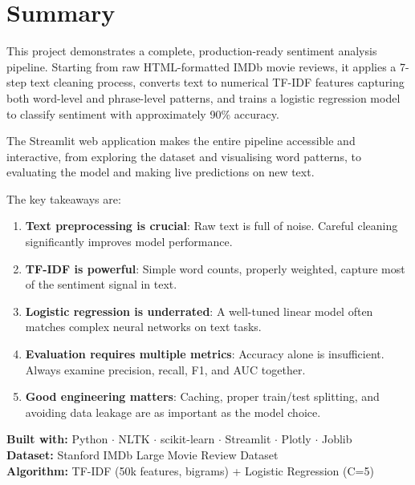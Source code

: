 \documentclass[12pt, a4paper]{article}
\begin{document}
\section{Summary}

This project demonstrates a complete, production-ready sentiment analysis pipeline. Starting from raw HTML-formatted IMDb movie reviews, it applies a 7-step text cleaning process, converts text to numerical TF-IDF features capturing both word-level and phrase-level patterns, and trains a logistic regression model to classify sentiment with approximately 90\% accuracy.

The Streamlit web application makes the entire pipeline accessible and interactive, from exploring the dataset and visualising word patterns, to evaluating the model and making live predictions on new text.

\medskip
The key takeaways are:

\begin{enumerate}
  \item \textbf{Text preprocessing is crucial}: Raw text is full of noise. Careful cleaning significantly improves model performance.
  \item \textbf{TF-IDF is powerful}: Simple word counts, properly weighted, capture most of the sentiment signal in text.
  \item \textbf{Logistic regression is underrated}: A well-tuned linear model often matches complex neural networks on text tasks.
  \item \textbf{Evaluation requires multiple metrics}: Accuracy alone is insufficient. Always examine precision, recall, F1, and AUC together.
  \item \textbf{Good engineering matters}: Caching, proper train/test splitting, and avoiding data leakage are as important as the model choice.
\end{enumerate}

\vfill
\begin{center}
\begin{tcolorbox}[colback=primary!10, colframe=primary, width=0.75\textwidth, arc=8pt]
\centering\small
\textbf{Built with:} Python $\cdot$ NLTK $\cdot$ scikit-learn $\cdot$ Streamlit $\cdot$ Plotly $\cdot$ Joblib \\[4pt]
\textbf{Dataset:} Stanford IMDb Large Movie Review Dataset \\[4pt]
\textbf{Algorithm:} TF-IDF (50k features, bigrams) + Logistic Regression (C=5)
\end{tcolorbox}
\end{center}
\end{document}
